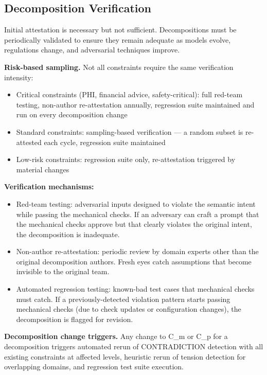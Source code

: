 \subsection{Decomposition Verification}


Initial attestation is necessary but not sufficient. Decompositions must be periodically validated to ensure they remain adequate as models evolve, regulations change, and adversarial techniques improve.

\textbf{Risk-based sampling.} Not all constraints require the same verification intensity:

\begin{itemize}
  \item Critical constraints (PHI, financial advice, safety-critical): full red-team testing, non-author re-attestation annually, regression suite maintained and run on every decomposition change
  \item Standard constraints: sampling-based verification --- a random subset is re-attested each cycle, regression suite maintained
  \item Low-risk constraints: regression suite only, re-attestation triggered by material changes
\end{itemize}


\textbf{Verification mechanisms:}

\begin{itemize}
  \item Red-team testing: adversarial inputs designed to violate the semantic intent while passing the mechanical checks. If an adversary can craft a prompt that the mechanical checks approve but that clearly violates the original intent, the decomposition is inadequate.
  \item Non-author re-attestation: periodic review by domain experts other than the original decomposition authors. Fresh eyes catch assumptions that become invisible to the original team.
  \item Automated regression testing: known-bad test cases that mechanical checks must catch. If a previously-detected violation pattern starts passing mechanical checks (due to check updates or configuration changes), the decomposition is flagged for revision.
\end{itemize}


\textbf{Decomposition change triggers.} Any change to C\_\allowbreak{}m or C\_\allowbreak{}p for a decomposition triggers automated rerun of CONTRADICTION detection with all existing constraints at affected levels, heuristic rerun of tension detection for overlapping domains, and regression test suite execution.

